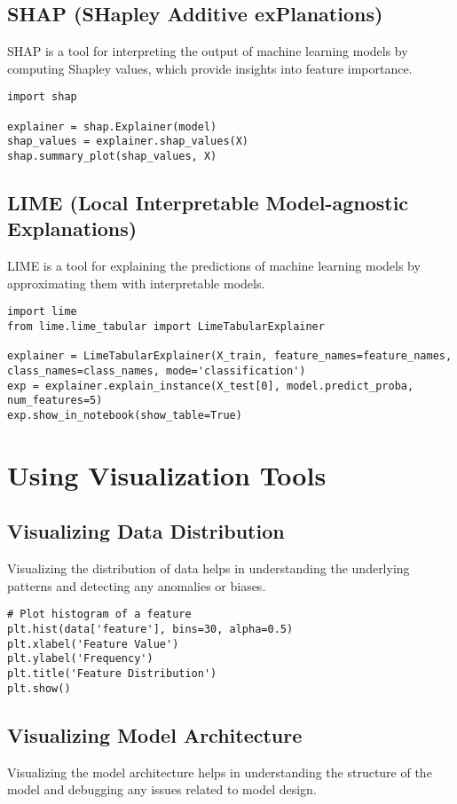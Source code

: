 \subsection{SHAP (SHapley Additive exPlanations)}
SHAP is a tool for interpreting the output of machine learning models by computing Shapley values, which provide insights into feature importance.

\begin{verbatim}
import shap

explainer = shap.Explainer(model)
shap_values = explainer.shap_values(X)
shap.summary_plot(shap_values, X)
\end{verbatim}

\subsection{LIME (Local Interpretable Model-agnostic Explanations)}
LIME is a tool for explaining the predictions of machine learning models by approximating them with interpretable models.

\begin{verbatim}
import lime
from lime.lime_tabular import LimeTabularExplainer

explainer = LimeTabularExplainer(X_train, feature_names=feature_names, class_names=class_names, mode='classification')
exp = explainer.explain_instance(X_test[0], model.predict_proba, num_features=5)
exp.show_in_notebook(show_table=True)
\end{verbatim}

\section{Using Visualization Tools}

\subsection{Visualizing Data Distribution}
Visualizing the distribution of data helps in understanding the underlying patterns and detecting any anomalies or biases.

\begin{verbatim}
# Plot histogram of a feature
plt.hist(data['feature'], bins=30, alpha=0.5)
plt.xlabel('Feature Value')
plt.ylabel('Frequency')
plt.title('Feature Distribution')
plt.show()
\end{verbatim}

\subsection{Visualizing Model Architecture}
Visualizing the model architecture helps in understanding the structure of the model and debugging any issues related to model design.

